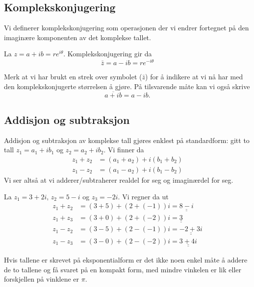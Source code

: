 \documentclass[a4paper,norsk,12pt]{article}
\newcommand{\ans}[1]{\underline{\underline{#1}}}
\newcounter{exa}
\begin{document}
\subsection{Komplekskonjugering}
Vi definerer komplekskonjugering som operasjonen der vi endrer fortegnet på den imaginære komponenten av det komplekse tallet. 
\begin{tdef}
	La $z = a + ib = re^{i\theta}$. Komplekskonjugering gir da
	\begin{displaymath}
		\bar{z} = a-ib = re^{-i\theta}
	\end{displaymath}
\end{tdef}
Merk at vi har brukt en strek over symbolet ($\bar{z}$) for å indikere at vi nå har med den komplekskonjugerte størrelsen å gjøre. På tilsvarende måte kan vi også skrive
\begin{displaymath}
	\overline{a+ib} = a - ib.
\end{displaymath}

\subsection{Addisjon og subtraksjon}
Addisjon og subtraksjon av komplekse tall gjøres enklest på standardform: gitt to tall $z_1 = a_1 + ib_1$ og $z_2 = a_2 + ib_2$. Vi finner da
\begin{align*}
	z_1 + z_2 &= (a_1+a_2) + i(b_1+b_2) \\
	z_1 - z_2 &= (a_1-a_2) + i(b_1-b_2) 
\end{align*}
Vi ser altså at vi adderer/subtraherer realdel for seg og imaginærdel for seg.

\begin{texample}
	La $z_1 = 3+ 2i$, $z_2 = 5-i$ og $z_3 = -2i$. Vi regner da ut
	\begin{align*}
		z_1 + z_2 &= (3+5) + (2+(-1))i = \ans{8 - i} \\ 
		z_1 + z_3 &= (3+0) + (2+(-2))i = \ans{3} \\
		z_1 - z_2 &= (3-5) + (2-(-1))i = \ans{-2 + 3i} \\ 
		z_1 - z_3 &= (3-0) + (2-(-2))i = \ans{3 + 4i} 
	\end{align*}
\end{texample}
Hvis tallene er skrevet på eksponentialform er det ikke noen enkel måte å addere de to tallene og få svaret på en kompakt form, med mindre vinkelen er lik eller forskjellen på vinklene er $\pi$.
\end{document}
